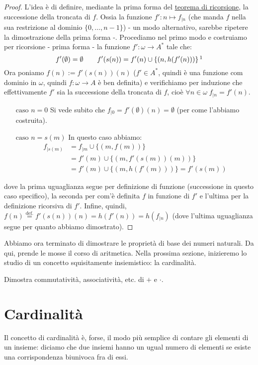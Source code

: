 \documentclass[11pt]{scrartcl}
\begin{document}
\begin{proof}
	L'idea è di definire, mediante la prima forma del \hyperref[ric1]{teorema di ricorsione}, la successione della troncata di $f$. Ossia la funzione $f' : n \mapsto f_{|n}$ (che manda $f$ nella sua restrizione al dominio $\{0,\ldots,n-1\}$) - un modo alternativo, sarebbe 
	ripetere la dimostrazione della prima forma -. Procediamo nel primo modo e costruiamo per ricorsione - prima forma - la funzione $f' : \omega \rightarrow A^*$ tale che:
	\[ f'(\emptyset) = \emptyset \qquad f'(s(n)) = f'(n) \cup \{(n,h(f'(n)))\}\,\footnote{Esiste ed è unica per il primo teorema di ricorsione}
		\]
	Ora poniamo $f(n) := f'(s(n))(n)$ ($f' \in A^*$, quindi è una funzione com dominio in $\omega$, quindi $f : \omega \rightarrow A$ è ben definita) e verifichiamo per induzione che effettivamente $f'$ sia la successione della troncata di $f$, cioè $\forall n \in \omega \; f_{|n} = f'(n)$.
	\begin{itemize}
		\item[$\boxed{\text{caso $n = 0$}}$] Si vede subito che $f_{|0} = f'(\emptyset)(n) = \emptyset$ (per come l'abbiamo costruita).
		\item[$\boxed{\text{caso $n = s(m)$}}$] In questo caso abbiamo:
		\[ \begin{split}
			f_{|s(m)} & = f_{|m} \cup \{(m,f(m))\}\\
					& = f'(m) \cup \{(m,f'(s(m))(m))\}\\
					& = f'(m) \cup \{(m,h(f'(m)))\} = f'(s(m))
		\end{split}
			\]
	\end{itemize}
	dove la prima uguaglianza segue per definizione di funzione (successione in questo caso specifico), la seconda per com'è definita $f$ in funzione di $f'$ e l'ultima per la definizione ricorsiva di $f'$. Infine, quindi, $f(n) \overset{\text{def.}}{=} f'(s(n))(n) = h(f'(n)) = h(f_{|n})$ (dove l'ultima uguaglianza segue per quanto abbiamo dimostrato).
\end{proof}

Abbiamo ora terminato di dimostrare le proprietà di base dei numeri naturali. Da qui, prende le mosse il corso di aritmetica. Nella prossima sezione, inizieremo
lo studio di un concetto squisitamente insiemistico: la cardinalità.

\begin{exercise}
	Dimostra commutatività, associatività, etc. di $+$ e $\cdot$.
\end{exercise}

\newpage
\section{Cardinalità}
Il concetto di cardinalità è, forse, il modo più semplice di contare gli elementi di un insieme: diciamo che due insiemi hanno un ugual numero di elementi se esiste
una corrispondenza biunivoca fra di essi.
\end{document}
